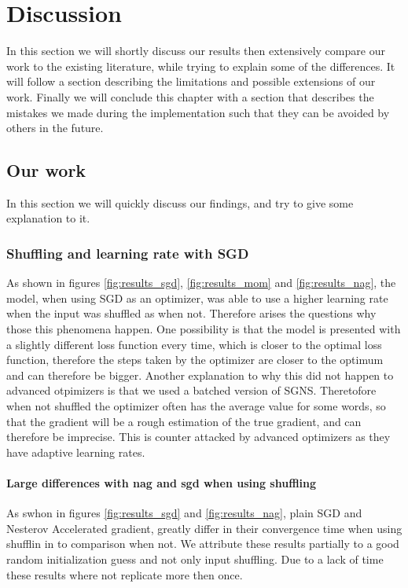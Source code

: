 \chapter{Discussion}\label{chap:discussion}



In this section we will shortly discuss our results then extensively compare our work to the existing literature, while trying to explain some of the differences. It will follow a section describing the limitations and possible extensions of our work. Finally we will conclude this chapter with a section that describes the mistakes we made during the implementation such that they can be avoided by others in the future.

\section{Our work}
In this section we will quickly discuss our findings, and try to give some explanation to it.  
\subsection{Shuffling and learning rate with SGD}
As shown in figures \ref{fig:results_sgd}, \ref{fig:results_mom} and \ref{fig:results_nag}, the model, when using SGD as an optimizer,  was able to use a higher learning rate when the input was shuffled as when not. Therefore arises the questions why those this phenomena happen. One possibility is that the model is presented with a slightly different loss function every time, which is closer to the optimal loss function, therefore the steps taken by the optimizer are closer to the optimum and can therefore be bigger. Another explanation to why this did not happen to advanced otpimizers is that we used a batched version of SGNS. Theretofore when not shuffled the optimizer often has the average value for some words, so that the gradient will be a rough estimation of the true gradient, and can therefore be imprecise. This is counter attacked by advanced optimizers as they have adaptive learning rates.
\subsubsection{Large differences with nag and sgd when using shuffling}
As swhon in figures \ref{fig:results_sgd} and \ref{fig:results_nag}, plain SGD and Nesterov Accelerated gradient, greatly differ in their convergence time when using shufflin in to comparison when not. We attribute these results partially to a good random initialization guess and not only input shuffling. Due to a lack of time these results where not replicate more then once. 

